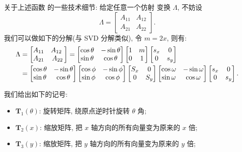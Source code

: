 \documentclass[
  hyper, lang=cn, 
  class=l3dox, 
]{../../zlatex/code/ztex}
\begin{document}
{\sffamily\color{red} 关于上述函数  的一些技术细节}: 给定任意一个仿射
变换 $\Lambda$, 不妨设
\[
  \Lambda = \begin{bmatrix}
    A_{11} & A_{12} \\
    A_{21} & A_{22}
  \end{bmatrix}.
\]
我们可以做如下的分解(与 SVD 分解类似), 令 $m=2x$, 则有:
\begin{align}\label{eq:affine-matrix}
  \Lambda 
  & = \begin{bmatrix} A_{11} & A_{12} \ \\ A_{21} & A_{22} \end{bmatrix} 
    = \begin{bmatrix} \cos \theta & -\sin \theta \\ \sin \theta & \cos \theta \end{bmatrix} 
    \begin{bmatrix} 1 & m \\ 0 & 1 \end{bmatrix} 
    \begin{bmatrix} s_x & 0 \\ 0 & s_y \end{bmatrix} \notag \\
  & = \begin{bmatrix} \cos \theta & -\sin \theta \\ \sin \theta & \cos \theta \end{bmatrix}
    \begin{bmatrix}\cos \phi&-\sin\phi\\\sin\phi&\cos\phi\end{bmatrix}
    \begin{bmatrix}S_x&0\\0&S_y\end{bmatrix}
    \begin{bmatrix}\cos \omega&-\sin\omega\\\sin\omega&\cos\omega\end{bmatrix}
    \begin{bmatrix} s_x & 0 \\ 0 & s_y \end{bmatrix}.
\end{align}

我们给出如下的记号:
\begin{itemize}
  \item $\mathbf{T}_1(\theta)$: 旋转矩阵, 绕原点逆时针旋转 $\theta$ 角;
  \item $\mathbf{T}_2(x)$: 缩放矩阵, 把 $x$ 轴方向的所有向量变为原来的 $x$ 倍;
  \item $\mathbf{T}_3(y)$: 缩放矩阵, 把 $y$ 轴方向的所有向量变为原来的 $y$ 倍;
\end{itemize}
\end{document}
